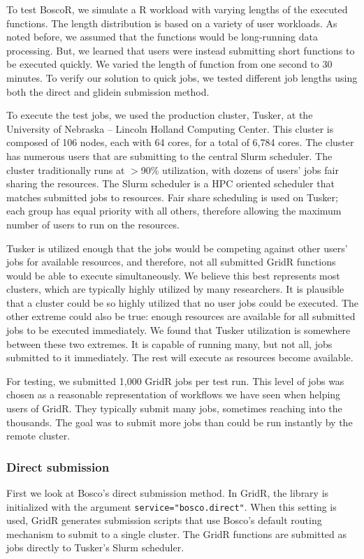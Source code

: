 To test BoscoR, we simulate a R workload with varying lengths of the executed functions.  The length distribution is based on a variety of user workloads.  As noted before, we assumed that the functions would be long-running data processing.  But, we learned that users were instead submitting short functions to be executed quickly.  We varied the length of function from one second to 30 minutes.  To verify our solution to quick jobs, we tested different job lengths using both the direct and glidein submission method.

To execute the test jobs, we used the production cluster, Tusker, at the University of Nebraska -- Lincoln Holland Computing Center.  This cluster is composed of 106 nodes, each with 64 cores, for a total of 6,784 cores.  The cluster has numerous users that are submitting to the central Slurm \cite{yoo2003slurm} scheduler.  The cluster traditionally runs at $>$90\% utilization, with dozens of users' jobs fair sharing the resources.  The Slurm scheduler is a HPC oriented scheduler that matches submitted jobs to resources.  Fair share scheduling is used on Tusker;  each group has equal priority with all others, therefore allowing the maximum number of users to run on the resources.

Tusker is utilized enough that the jobs would be competing against other users' jobs for available resources, and therefore, not all submitted GridR functions would be able to execute simultaneously.  We believe this best represents most clusters, which are typically highly utilized by many researchers.  It is plausible that a cluster could be so highly utilized that no user jobs could be executed. The other extreme could also be true: enough resources are available for all submitted jobs to be executed immediately.  We found that Tusker utilization is somewhere between these two extremes.  It is capable of running many, but not all, jobs submitted to it immediately.  The rest will execute as resources become available.

For testing, we submitted 1,000 GridR jobs per test run. This level of jobs was chosen as a reasonable representation of workflows we have seen when helping users of GridR.  They typically submit many jobs, sometimes reaching into the thousands.  The goal was to submit more jobs than could be run instantly by the remote cluster.

\subsubsection{Direct submission}
First we look at Bosco's direct submission method.  In GridR, the library is initialized with the argument \texttt{service="bosco.direct"}.  When this setting is used, GridR generates submission scripts that use Bosco's default routing mechanism to submit to a single cluster.  The GridR functions are submitted as jobs directly to Tusker's Slurm scheduler.

